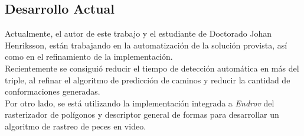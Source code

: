 \subsection*{Desarrollo Actual}

Actualmente, el autor de este trabajo y el estudiante de Doctorado Johan Henriksson,
est\'an trabajando en la automatizaci\'on de la soluci\'on provista, as\'i como
en el refinamiento de la implementaci\'on.\\
Recientemente se consigui\'o reducir el tiempo de detecci\'on autom\'atica en m\'as
del triple, al refinar el algoritmo de predicci\'on de caminos y reducir la cantidad
de conformaciones generadas.\\

Por otro lado, se est\'a utilizando la implementaci\'on integrada a \emph{Endrov}
del rasterizador de pol\'igonos y descriptor general de formas para desarrollar
un algoritmo de rastreo de peces en video.








